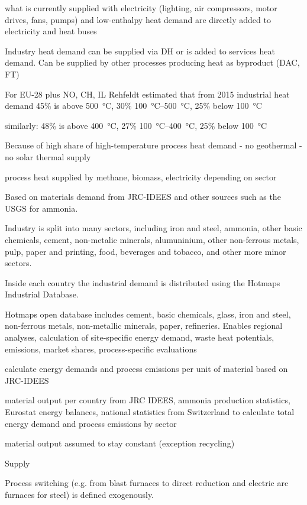 what is currently supplied with electricity (lighting, air compressors, motor drives, fans, pumps)
and low-enthalpy heat demand are directly added to electricity and heat buses

Industry heat demand can be supplied via DH or is added to services heat demand.
Can be supplied by other processes producing heat as byproduct (DAC, FT)

For EU-28 plus NO, CH, IL Rehfeldt estimated that from 2015 industrial heat demand
45\% is above \SI{500}{\celsius}, 30\% \SIrange{100}{500}{\celsius}, 25\% below \SI{100}{\celsius}

 similarly:
48\% is above \SI{400}{\celsius}, 27\% \SIrange{100}{400}{\celsius}, 25\% below \SI{100}{\celsius}

Because of high share of high-temperature process heat demand
- no geothermal
- no solar thermal supply

process heat supplied by methane, biomass, electricity depending on sector

Based on materials demand from JRC-IDEES and other sources such as the USGS for
ammonia.

Industry is split into many sectors, including iron and steel, ammonia, other
basic chemicals, cement, non-metalic minerals, alumuninium, other non-ferrous
metals, pulp, paper and printing, food, beverages and tobacco, and other more
minor sectors.

Inside each country the industrial demand is distributed using the Hotmaps
Industrial Database.

Hotmaps open database includes cement, basic chemicals, glass, iron and steel, non-ferrous metals,
non-metallic minerals, paper, refineries. Enables regional analyses, calculation of
site-specific energy demand, waste heat potentials, emissions, market shares,
process-specific evaluations

calculate energy demands and process emissions per unit of material based on JRC-IDEES

material output per country from JRC IDEES, ammonia production statistics,
Eurostat energy balances, national statistics from Switzerland to calculate total energy demand
and process emissions by sector

material output assumed to stay constant (exception recycling)

Supply

Process switching (e.g. from blast furnaces to direct reduction and electric arc
furnaces for steel) is defined exogenously.

